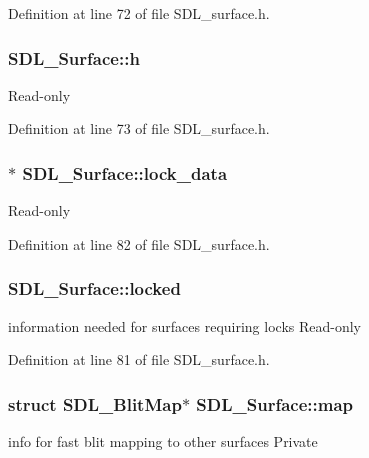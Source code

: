 Definition at line 72 of file S\-D\-L\-\_\-surface.\-h.

\hypertarget{struct_s_d_l___surface_af33bcf87a1f5e10a99b3c7e8626b38c8}{
\subsubsection[{h}]{ S\-D\-L\-\_\-\-Surface\-::h}}\label{struct_s_d_l___surface_af33bcf87a1f5e10a99b3c7e8626b38c8}
Read-\/only 

Definition at line 73 of file S\-D\-L\-\_\-surface.\-h.

\hypertarget{struct_s_d_l___surface_a0afacfb933b54a9af0846a307a6924fb}{
\subsubsection[{lock\-\_\-data}]{$\ast$ S\-D\-L\-\_\-\-Surface\-::lock\-\_\-data}}\label{struct_s_d_l___surface_a0afacfb933b54a9af0846a307a6924fb}
Read-\/only 

Definition at line 82 of file S\-D\-L\-\_\-surface.\-h.

\hypertarget{struct_s_d_l___surface_a5022edaeea1c0a055fa5d6dccba41de2}{
\subsubsection[{locked}]{ S\-D\-L\-\_\-\-Surface\-::locked}}\label{struct_s_d_l___surface_a5022edaeea1c0a055fa5d6dccba41de2}
information needed for surfaces requiring locks Read-\/only 

Definition at line 81 of file S\-D\-L\-\_\-surface.\-h.

\hypertarget{struct_s_d_l___surface_a8c1ecad399b0d4f525b1a53b6ee9393f}{
\subsubsection[{map}]{\setlength{\rightskip}{0pt plus 5cm}struct S\-D\-L\-\_\-\-Blit\-Map$\ast$ S\-D\-L\-\_\-\-Surface\-::map}}\label{struct_s_d_l___surface_a8c1ecad399b0d4f525b1a53b6ee9393f}
info for fast blit mapping to other surfaces Private 

